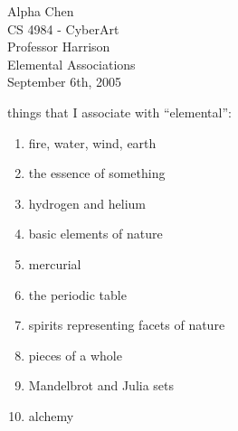\documentclass[11pt]{article}
\begin{document}

\begin{flushright}
{Alpha Chen}\\{CS 4984 - CyberArt}\\{Professor Harrison}\\{Elemental Associations}\\{September 6th, 2005}
\end{flushright}


 things that I associate with ``elemental'':

\begin{enumerate}
  \setlength{\itemsep}{1pt}
  \setlength{\parskip}{0pt}
  \setlength{\parsep}{0pt}

  \item fire, water, wind, earth
  \item the essence of something
  \item hydrogen and helium
  \item basic elements of nature
  \item mercurial
  \item the periodic table
  \item spirits representing facets of nature
  \item pieces of a whole
  \item Mandelbrot and Julia sets
  \item alchemy

\end{enumerate}
\end{document}
